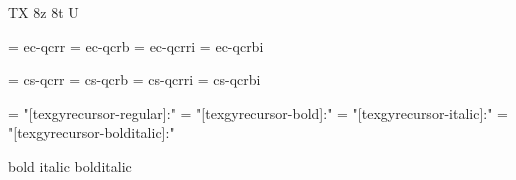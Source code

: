 
\ifx\ffdecl\undefined  \fi

\ffdecl [TG Cursor] {\caps} {\rm \bf \it \bi} {} {TX} {8z 8t U}

\def\caps{\ffsetV{caps}{-sc}\ffsetX}  \def\nocaps{\ffsetV{caps}{}\ffsetX}
\def\capsV{} 

\ismacro{}\ifttrue

   \font\tenrm = ec-qcrr  \sizespec
   \font\tenbf = ec-qcrb  \sizespec
   \font\tenit = ec-qcrri \sizespec
   \font\tenbi = ec-qcrbi \sizespec

   \def\ffnamegen{ec-qcr\ffvarV\capsV}

\fi

\ismacro{}\iftrue

   \font\tenrm = cs-qcrr  \sizespec
   \font\tenbf = cs-qcrb  \sizespec
   \font\tenit = cs-qcrri \sizespec
   \font\tenbi = cs-qcrbi \sizespec

   \def\ffnamegen{cs-qcr\ffvarV\capsV}
   

\fi

\ismacro{}\iftrue

   \font\tenrm = "[texgyrecursor-regular]:\fontfeatures"    \sizespec
   \font\tenbf = "[texgyrecursor-bold]:\fontfeatures"       \sizespec
   \font\tenit = "[texgyrecursor-italic]:\fontfeatures"     \sizespec
   \font\tenbi = "[texgyrecursor-bolditalic]:\fontfeatures" \sizespec

   \def\ffnamegen{"[texgyrecursor-\ffvarV]:\capsV\fontfeatures"} 

    {bold} {italic} {bolditalic}
   \def\caps{\ffsetV{caps}{+smcp;}\ffsetX}

\fi
\tenrm %

\ifx\loadmathfonts\relax \endinput \fi
\ifx\mathpreloaded X\else  \fi                     

\endinput
